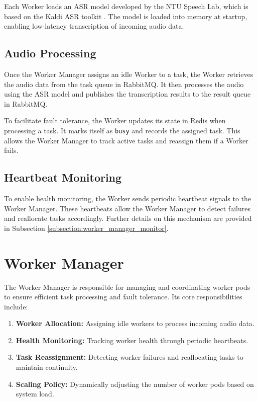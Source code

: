 Each Worker loads an ASR model developed by the NTU Speech Lab, which is based on the Kaldi ASR toolkit \cite{kaldi}. The model is loaded into memory at startup, enabling low-latency transcription of incoming audio data.

\subsection{Audio Processing}
Once the Worker Manager assigns an idle Worker to a task, the Worker retrieves the audio data from the task queue in RabbitMQ. It then processes the audio using the ASR model and publishes the transcription results to the result queue in RabbitMQ.  

To facilitate fault tolerance, the Worker updates its state in Redis when processing a task. It marks itself as \texttt{busy} and records the assigned task. This allows the Worker Manager to track active tasks and reassign them if a Worker fails.

\subsection{Heartbeat Monitoring}
To enable health monitoring, the Worker sends periodic heartbeat signals to the Worker Manager. These heartbeats allow the Worker Manager to detect failures and reallocate tasks accordingly. Further details on this mechanism are provided in Subsection \ref{subsection:worker_manager_monitor}.

\section{Worker Manager} \label{section:worker_manager}
The Worker Manager is responsible for managing and coordinating worker pods to ensure efficient task processing and fault tolerance. Its core responsibilities include:
\begin{enumerate}
  \item \textbf{Worker Allocation:} Assigning idle workers to process incoming audio data.
  \item \textbf{Health Monitoring:} Tracking worker health through periodic heartbeats.
  \item \textbf{Task Reassignment:} Detecting worker failures and reallocating tasks to maintain continuity.
  \item \textbf{Scaling Policy:} Dynamically adjusting the number of worker pods based on system load.
\end{enumerate}


